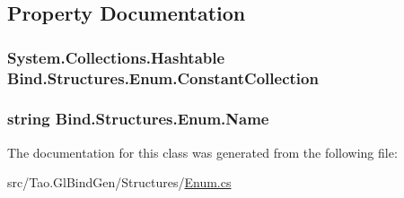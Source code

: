 \subsection{Property Documentation}
\hypertarget{class_bind_1_1_structures_1_1_enum_a88a2bdd5d2b659a5963e4bf9e81c3ef3}{
\subsubsection[{ConstantCollection}]{\setlength{\rightskip}{0pt plus 5cm}System.Collections.Hashtable Bind.Structures.Enum.ConstantCollection}}
\label{class_bind_1_1_structures_1_1_enum_a88a2bdd5d2b659a5963e4bf9e81c3ef3}
\hypertarget{class_bind_1_1_structures_1_1_enum_a492ac2beac734b66fbe9aba855b1a9e3}{
\subsubsection[{Name}]{\setlength{\rightskip}{0pt plus 5cm}string Bind.Structures.Enum.Name}}
\label{class_bind_1_1_structures_1_1_enum_a492ac2beac734b66fbe9aba855b1a9e3}


The documentation for this class was generated from the following file:\begin{DoxyCompactItemize}
\item 
src/Tao.GlBindGen/Structures/\hyperlink{_enum_8cs}{Enum.cs}\end{DoxyCompactItemize}
